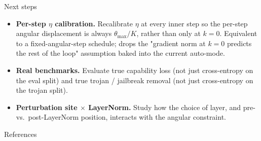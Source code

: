 \documentclass[10pt,aspectratio=169]{beamer}
\newcommand{\thmax}{\theta_{\max}}
\begin{document}
\begin{frame}{Next steps}
\begin{itemize}
\item \textbf{Per-step $\eta$ calibration.} Recalibrate $\eta$ at every inner step so the per-step angular displacement is always $\thmax / K$, rather than only at $k = 0$. Equivalent to a fixed-angular-step schedule; drops the "gradient norm at $k=0$ predicts the rest of the loop" assumption baked into the current auto-mode.
\item \textbf{Real benchmarks.} Evaluate true capability loss (not just cross-entropy on the eval split) and true trojan / jailbreak removal (not just cross-entropy on the trojan split).
\item \textbf{Perturbation site $\times$ LayerNorm.} Study how the choice of layer, and pre- vs.\ post-LayerNorm position, interacts with the angular constraint.
\end{itemize}
\end{frame}

\begin{frame}[allowframebreaks]{References}
\footnotesize

\end{frame}
\end{document}
